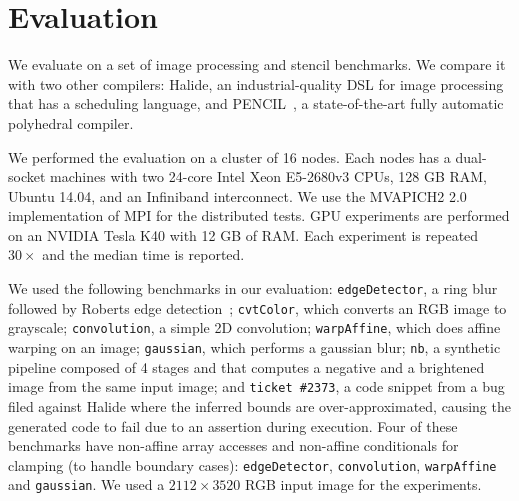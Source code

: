 \vspace{-0.25cm}
\section{Evaluation}

We evaluate \framework{} on a set of image processing and stencil benchmarks.  We compare it with two other compilers: Halide\cite{halide_12}, 
an industrial-quality DSL for image processing that has a scheduling language, and PENCIL~\cite{pencil_paper}, a state-of-the-art fully automatic polyhedral compiler.

We performed the evaluation on a cluster of 16 nodes. Each nodes has a dual-socket machines with two 24-core Intel Xeon E5-2680v3 CPUs, 128 GB RAM, Ubuntu 14.04, and an Infiniband interconnect.  We use the MVAPICH2 2.0 \cite{mvapich2} implementation of MPI for the distributed tests.
GPU experiments are performed on an NVIDIA Tesla K40 with 12 GB of RAM.  Each experiment is repeated $30\times$ and the median time is reported.

We used the following benchmarks in our evaluation: \texttt{edgeDetector}, a ring blur followed by Roberts edge detection~\cite{roberts65}; \texttt{cvtColor}, which converts an RGB image to grayscale; \texttt{convolution}, a simple 2D convolution; \texttt{warpAffine}, which does affine warping on an image;  \texttt{gaussian}, which performs a gaussian blur; \texttt{nb}, a synthetic pipeline composed of 4 stages and that computes a negative and a brightened image from the same input image; and \texttt{ticket \#2373}, a code snippet from a bug filed against Halide where the inferred bounds are over-approximated, causing the generated code to fail due to an assertion during execution.
Four of these benchmarks have non-affine array accesses and non-affine conditionals for clamping (to handle boundary cases): \texttt{edgeDetector}, \texttt{convolution}, \texttt{warpAffine} and \texttt{gaussian}.
We used a $2112\times3520$ RGB input image for the experiments.


